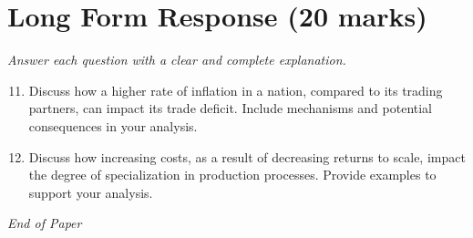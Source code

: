 \documentclass[12pt]{article}
\begin{document}
\section*{Long Form Response (20 marks)}
\textit{Answer each question with a clear and complete explanation.}
\begin{enumerate}[label=\arabic*.]
\setcounter{enumi}{10}
\item Discuss how a higher rate of inflation in a nation, compared to its trading partners, can impact its trade deficit. Include mechanisms and potential consequences in your analysis.
\item Discuss how increasing costs, as a result of decreasing returns to scale, impact the degree of specialization in production processes. Provide examples to support your analysis.
\end{enumerate}

\vfill
\noindent\textit{End of Paper}
\end{document}
